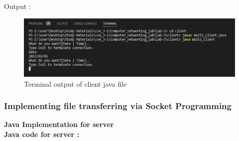 \documentclass[11pt]{article}
\begin{document}
 Output : 
  \begin{figure}[!h]
\centering
\includegraphics[width=\textwidth]{mclient.png}
\caption{Terminal output of client java file }
\end{figure}
\FloatBarrier



\subsubsection{Implementing file transferring via Socket Programming}

\vspace{.5cm}
\textbf{Java Implementation for server}\\[12pt]

\vspace{1cm}
\textbf{Java code for server : }\\[12pt]
\end{document}
